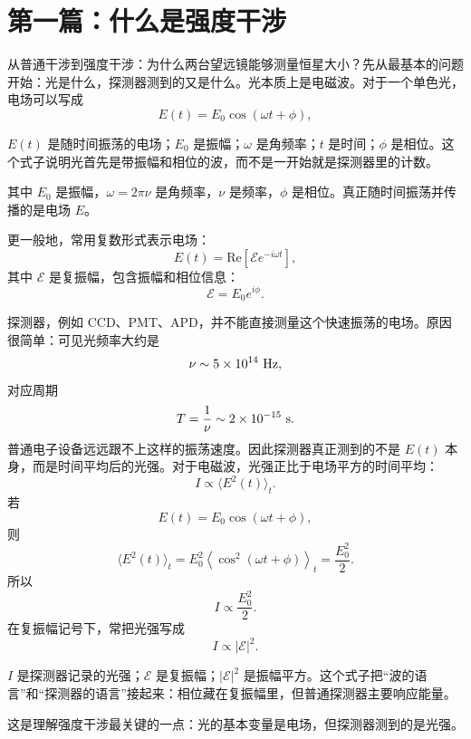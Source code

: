 \chapter*{第一篇：什么是强度干涉}
{}
\label{quickstart:intensity-interferometry}

从普通干涉到强度干涉：为什么两台望远镜能够测量恒星大小？先从最基本的问题开始：光是什么，探测器测到的又是什么。光本质上是电磁波。对于一个单色光，电场可以写成
\[
  E(t)=E_0\cos(\omega t+\phi),
\]
\begin{formulaexplain}[电场记号解读]
\(E(t)\) 是随时间振荡的电场；\(E_0\) 是振幅；\(\omega\) 是角频率；\(t\) 是时间；\(\phi\) 是相位。这个式子说明光首先是带振幅和相位的波，而不是一开始就是探测器里的计数。
\end{formulaexplain}
其中 \(E_0\) 是振幅，\(\omega=2\pi\nu\) 是角频率，\(\nu\) 是频率，\(\phi\) 是相位。真正随时间振荡并传播的是电场 \(E\)。

更一般地，常用复数形式表示电场：
\[
  E(t)=\mathrm{Re}\left[\mathcal E e^{-i\omega t}\right],
\]
其中 \(\mathcal E\) 是复振幅，包含振幅和相位信息：
\[
  \mathcal E=E_0 e^{i\phi}.
\]

探测器，例如 CCD、PMT、APD，并不能直接测量这个快速振荡的电场。原因很简单：可见光频率大约是
\[
  \nu\sim 5\times 10^{14}\ {\rm Hz},
\]
对应周期
\[
  T=\frac{1}{\nu}\sim 2\times 10^{-15}\ {\rm s}.
\]
普通电子设备远远跟不上这样的振荡速度。因此探测器真正测到的不是 \(E(t)\) 本身，而是时间平均后的光强。对于电磁波，光强正比于电场平方的时间平均：
\[
  I\propto \langle E^2(t)\rangle_t.
\]
若
\[
  E(t)=E_0\cos(\omega t+\phi),
\]
则
\[
  \langle E^2(t)\rangle_t
  =
  E_0^2\left\langle \cos^2(\omega t+\phi)\right\rangle_t
  =
  \frac{E_0^2}{2}.
\]
所以
\[
  I\propto \frac{E_0^2}{2}.
\]
在复振幅记号下，常把光强写成
\[
  I\propto |\mathcal E|^2.
\]
\begin{formulaexplain}[强度公式解读]
\(I\) 是探测器记录的光强；\(\mathcal E\) 是复振幅；\(|\mathcal E|^2\) 是振幅平方。这个式子把“波的语言”和“探测器的语言”接起来：相位藏在复振幅里，但普通探测器主要响应能量。
\end{formulaexplain}
这是理解强度干涉最关键的一点：光的基本变量是电场，但探测器测到的是光强。

